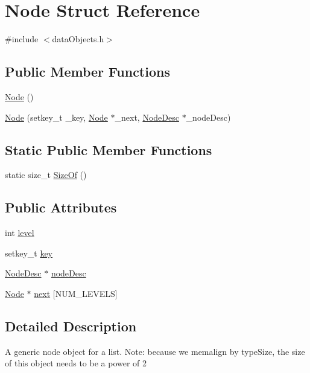 \hypertarget{structNode}{}\section{Node Struct Reference}
\label{structNode}


{\ttfamily \#include $<$data\+Objects.\+h$>$}

\subsection*{Public Member Functions}
\begin{DoxyCompactItemize}
\item 
\hyperlink{structNode_ad7a34779cad45d997bfd6d3d8043c75f}{Node} ()
\item 
\hyperlink{structNode_a9f1ed45afe640a4e113f264c424c28b0}{Node} (setkey\+\_\+t \+\_\+key, \hyperlink{structNode}{Node} $\ast$\+\_\+next, \hyperlink{structNodeDesc}{Node\+Desc} $\ast$\+\_\+node\+Desc)
\end{DoxyCompactItemize}
\subsection*{Static Public Member Functions}
\begin{DoxyCompactItemize}
\item 
static size\+\_\+t \hyperlink{structNode_ac6efad16dddc643b5990ef1c676d9c48}{Size\+Of} ()
\end{DoxyCompactItemize}
\subsection*{Public Attributes}
\begin{DoxyCompactItemize}
\item 
int \hyperlink{structNode_a8728a644d0aa9bcc8fc6a6f935077277}{level}
\item 
setkey\+\_\+t \hyperlink{structNode_a3499b8b8442463365dd1cb7bce41b3d5}{key}
\item 
\hyperlink{structNodeDesc}{Node\+Desc} $\ast$ \hyperlink{structNode_aa147c0f286a8b3913347af793b6c8a57}{node\+Desc}
\item 
\hyperlink{structNode}{Node} $\ast$ \hyperlink{structNode_ad97b8a94c8f12b5f679ba5318e268733}{next} \mbox{[}N\+U\+M\+\_\+\+L\+E\+V\+E\+LS\mbox{]}
\end{DoxyCompactItemize}


\subsection{Detailed Description}
A generic node object for a list. Note\+: because we memalign by type\+Size, the size of this object needs to be a power of 2 

